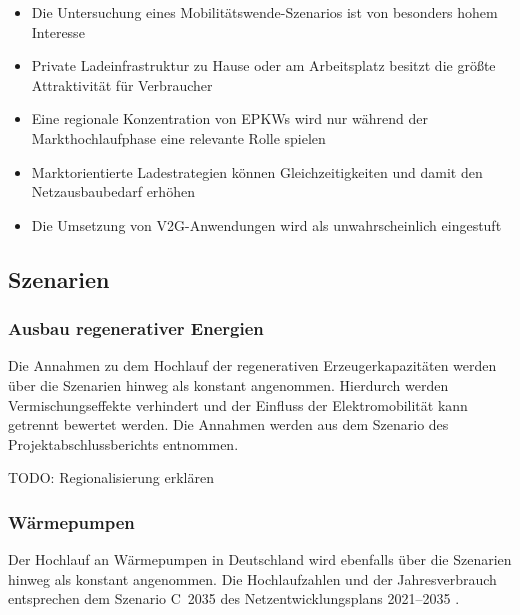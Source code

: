 \begin{itemize}
	\item Die Untersuchung eines Mobilitätswende-Szenarios ist von besonders hohem Interesse
	\item Private Ladeinfrastruktur zu Hause oder am Arbeitsplatz besitzt die größte Attraktivität für Verbraucher
	\item Eine regionale Konzentration von \glspl{EPKW} wird nur während der Markthochlaufphase eine relevante Rolle spielen
	\item Marktorientierte Ladestrategien können Gleichzeitigkeiten und damit den Netzausbaubedarf erhöhen
	\item Die Umsetzung von \gls{V2G}-Anwendungen wird als unwahrscheinlich eingestuft
	
\end{itemize}

\subsection{Szenarien}

\subsubsection{Ausbau regenerativer Energien}

Die Annahmen zu dem Hochlauf der regenerativen Erzeugerkapazitäten werden über die Szenarien hinweg als konstant angenommen.
Hierdurch werden Vermischungseffekte verhindert und der Einfluss der Elektromobilität kann getrennt bewertet werden.
Die Annahmen werden aus dem Szenario \ego des \openego Projektabschlussberichts \cite{Mueller2019} entnommen.



{\color{red} TODO: Regionalisierung erklären}

\subsubsection{Wärmepumpen}

Der Hochlauf an Wärmepumpen in Deutschland wird ebenfalls über die Szenarien hinweg als konstant angenommen.
Die Hochlaufzahlen und der Jahresverbrauch entsprechen dem Szenario C~\num{2035} des Netzentwicklungsplans \numrange[range-phrase=~{--}~]{2021}{2035} \cite{BNetzA2020}.

